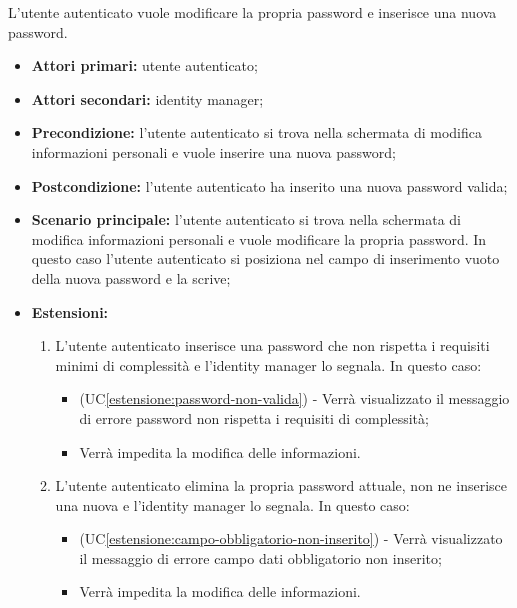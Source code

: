 \label{modifica-password.nuova-password}

L'utente autenticato vuole modificare la propria password e inserisce una nuova password.
\begin{itemize}
    \item \textbf{Attori primari:} utente autenticato;
    \item \textbf{Attori secondari:} identity manager;
    \item \textbf{Precondizione:} l'utente autenticato si trova nella schermata di modifica informazioni personali e vuole inserire una nuova password;
    \item \textbf{Postcondizione:} l'utente autenticato ha inserito una nuova password valida;
    \item \textbf{Scenario principale:} l'utente autenticato si trova nella schermata di modifica informazioni personali e vuole modificare la propria password. In questo caso l'utente autenticato si posiziona nel campo di inserimento vuoto della nuova password e la scrive;
    \item \textbf{Estensioni:}
    \begin{enumerate}[label=\lett]
        \item L'utente autenticato inserisce una password che non rispetta i requisiti minimi di complessità e l'identity manager lo segnala. In questo caso:
        \begin{itemize}
            \item (UC\ref{estensione:password-non-valida}) - Verrà visualizzato il messaggio di errore password non rispetta i requisiti di complessità;
            \item Verrà impedita la modifica delle informazioni.
        \end{itemize}
        \item L'utente autenticato elimina la propria password attuale, non ne inserisce una nuova e l'identity manager lo segnala. In questo caso:
        \begin{itemize}
            \item (UC\ref{estensione:campo-obbligatorio-non-inserito}) - Verrà visualizzato il messaggio di errore campo dati obbligatorio non inserito;
            \item Verrà impedita la modifica delle informazioni.
        \end{itemize}
    \end{enumerate}
\end{itemize}

